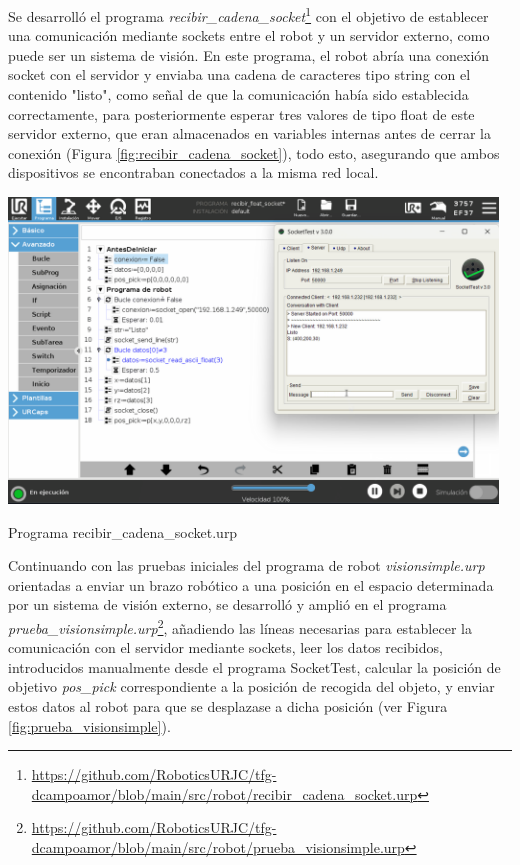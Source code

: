 Se desarrolló el programa \textit{recibir\_cadena\_socket}\footnote{\url{https://github.com/RoboticsURJC/tfg-dcampoamor/blob/main/src/robot/recibir_cadena_socket.urp}} con el objetivo de establecer una comunicación mediante sockets entre el robot y un servidor externo, como puede ser un sistema de visión. En este programa, el robot abría una conexión socket con el servidor y enviaba una cadena de caracteres tipo string con el contenido "listo", como señal de que la comunicación había sido establecida correctamente, para posteriormente esperar tres valores de tipo float de este servidor externo, que eran almacenados en variables internas antes de cerrar la conexión (Figura \ref{fig:recibir_cadena_socket}), todo esto, asegurando que ambos dispositivos se encontraban conectados a la misma red local.

   \begin{table}[H]
     \centering
     \begin{center}
       \includegraphics[width=130mm]{figs/recibir_cadena_socket.png}
     \end{center}
     \caption{Programa recibir\_cadena\_socket.urp}
     \label{fig:recibir_cadena_socket}
  \end{table}

Continuando con las pruebas iniciales del programa de robot \textit{visionsimple.urp} orientadas a enviar un brazo robótico a una posición en el espacio determinada por un sistema de visión externo, se desarrolló y amplió en el programa \textit{prueba\_visionsimple.urp}\footnote{\url{https://github.com/RoboticsURJC/tfg-dcampoamor/blob/main/src/robot/prueba_visionsimple.urp}}, añadiendo las líneas necesarias para establecer la comunicación con el servidor mediante sockets, leer los datos recibidos, introducidos manualmente desde el programa SocketTest, calcular la posición de objetivo \textit{pos\_pick} correspondiente a la posición de recogida del objeto, y enviar estos datos al robot para que se desplazase a dicha posición (ver Figura \ref{fig:prueba_visionsimple}). 

